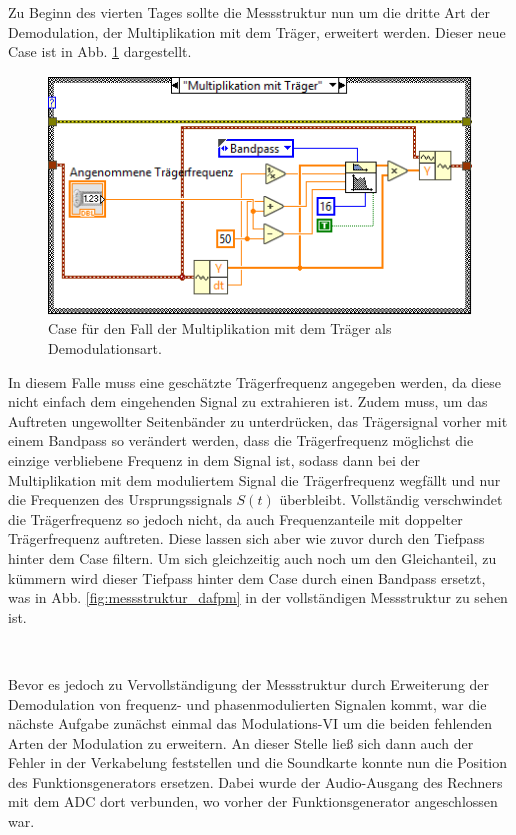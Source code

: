 
\pagestyle{headings}
Zu Beginn des vierten Tages sollte die Messstruktur nun um die dritte Art der Demodulation, der Multiplikation mit dem Träger, erweitert werden.
Dieser neue Case ist in Abb. \ref{fig:messstruktur_dam_case3} dargestellt.
\begin{figure}[H]
	\centering
	\includegraphics[width=\textwidth]{pic/messstruktur_dam_case3.png}
	\caption{Case für den Fall der  Multiplikation mit dem Träger als Demodulationsart.}
	\label{fig:messstruktur_dam_case3}	
\end{figure} 
In diesem Falle muss eine geschätzte Trägerfrequenz angegeben werden, da diese nicht einfach dem eingehenden Signal zu extrahieren ist.
Zudem muss, um das Auftreten ungewollter Seitenbänder zu unterdrücken, das Trägersignal vorher mit einem Bandpass so verändert werden, dass die Trägerfrequenz möglichst die einzige verbliebene Frequenz in dem Signal ist, sodass dann bei der Multiplikation mit dem moduliertem Signal die Trägerfrequenz wegfällt und nur die Frequenzen des Ursprungssignals $S(t)$ überbleibt.
Vollständig verschwindet die Trägerfrequenz so jedoch nicht, da auch Frequenzanteile mit doppelter Trägerfrequenz auftreten.
Diese lassen sich aber wie zuvor durch den Tiefpass hinter dem Case filtern.
Um sich gleichzeitig auch noch um den Gleichanteil, zu kümmern wird dieser Tiefpass hinter dem Case durch einen Bandpass ersetzt, was in Abb. \ref{fig:messstruktur_dafpm} in der vollständigen Messstruktur zu sehen ist.
	
\

Bevor es jedoch zu Vervollständigung der Messstruktur durch Erweiterung der Demodulation von frequenz- und phasenmodulierten Signalen kommt, war die nächste Aufgabe zunächst einmal das Modulations-VI um die beiden fehlenden Arten der Modulation zu erweitern.
An dieser Stelle ließ sich dann auch der Fehler in der Verkabelung feststellen und die Soundkarte konnte nun die Position des Funktionsgenerators ersetzen.
Dabei wurde der Audio-Ausgang des Rechners mit dem ADC dort verbunden, wo vorher der Funktionsgenerator angeschlossen war.
	
